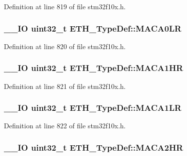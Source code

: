 Definition at line 819 of file stm32f10x.\-h.

\hypertarget{struct_e_t_h___type_def_a9c939e1e21924c888ee2c31dee9e810a}{
\subsubsection[{M\-A\-C\-A0\-L\-R}]{\setlength{\rightskip}{0pt plus 5cm}\-\_\-\-\_\-\-I\-O {\bf uint32\-\_\-t} E\-T\-H\-\_\-\-Type\-Def\-::\-M\-A\-C\-A0\-L\-R}}\label{struct_e_t_h___type_def_a9c939e1e21924c888ee2c31dee9e810a}


Definition at line 820 of file stm32f10x.\-h.

\hypertarget{struct_e_t_h___type_def_a8f7f8cbf64bf3ce73a6d25ca019ca712}{
\subsubsection[{M\-A\-C\-A1\-H\-R}]{\setlength{\rightskip}{0pt plus 5cm}\-\_\-\-\_\-\-I\-O {\bf uint32\-\_\-t} E\-T\-H\-\_\-\-Type\-Def\-::\-M\-A\-C\-A1\-H\-R}}\label{struct_e_t_h___type_def_a8f7f8cbf64bf3ce73a6d25ca019ca712}


Definition at line 821 of file stm32f10x.\-h.

\hypertarget{struct_e_t_h___type_def_ad0b7882917068bd398d4d8e209794ead}{
\subsubsection[{M\-A\-C\-A1\-L\-R}]{\setlength{\rightskip}{0pt plus 5cm}\-\_\-\-\_\-\-I\-O {\bf uint32\-\_\-t} E\-T\-H\-\_\-\-Type\-Def\-::\-M\-A\-C\-A1\-L\-R}}\label{struct_e_t_h___type_def_ad0b7882917068bd398d4d8e209794ead}


Definition at line 822 of file stm32f10x.\-h.

\hypertarget{struct_e_t_h___type_def_a1ad00033d223abb9075df5bf38894445}{
\subsubsection[{M\-A\-C\-A2\-H\-R}]{\setlength{\rightskip}{0pt plus 5cm}\-\_\-\-\_\-\-I\-O {\bf uint32\-\_\-t} E\-T\-H\-\_\-\-Type\-Def\-::\-M\-A\-C\-A2\-H\-R}}\label{struct_e_t_h___type_def_a1ad00033d223abb9075df5bf38894445}


